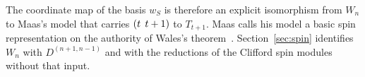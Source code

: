 \begin{remark}\label{rem:maas}
The coordinate map of the basis $w_S$ is therefore an explicit isomorphism from $W_n$ to Maas's model that carries $(t\;\,t+1)$ to $T_{t+1}$. Maas calls his model a basic spin representation on the authority of Wales's theorem~\cite[Thm.~1]{Maas10}. Section~\ref{sec:spin} identifies $W_n$ with $D^{(n+1,n-1)}$ and with the reductions of the Clifford spin modules without that input.
\end{remark}
